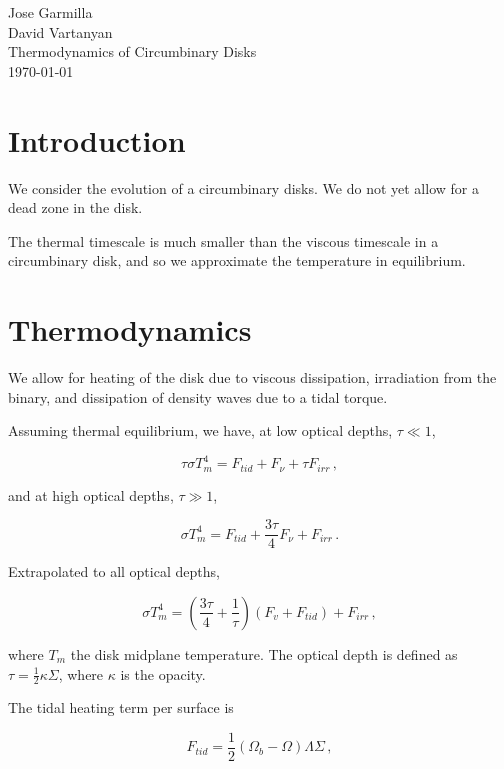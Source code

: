 \documentclass{article}
\begin{document}
\begin{flushleft}
Jose Garmilla \\
David Vartanyan\\
Thermodynamics of Circumbinary Disks\\
\today\\
\end{flushleft}

\section{Introduction}
We consider the evolution of a circumbinary disks. We do not yet allow for a dead zone in the disk.

The thermal timescale is much smaller than the viscous timescale in a circumbinary disk, and so we approximate the temperature in equilibrium.

\section{Thermodynamics}
We allow for heating of the disk due to viscous dissipation, irradiation from the binary, and dissipation of density waves due to a tidal torque.

Assuming thermal equilibrium, we have, at low optical depths, $\tau \ll 1$,

\begin{equation}
\tau \sigma T_m^4 = F_{tid} + F_{\nu} + \tau F_{irr}\,,
\end{equation}

and at high optical depths, $\tau \gg 1$,

\begin{equation}
\sigma T_m^4 = F_{tid} + \frac{3\tau}{4}  F_\nu + F_{irr}\,.
\end{equation}

Extrapolated to all optical depths,

\begin{equation} \label{eq:encon}
\sigma T_m^4= \left(\frac{3\tau}{4} + \frac{1}{\tau}\right) \left(F_{v} + F_{tid}\right) + F_{irr}\,,
\end{equation}

where $T_m$ the disk midplane temperature. The optical depth is defined as $\tau =\frac{1}{2} \kappa \Sigma$, where $\kappa$ is the opacity.

The tidal heating term per surface is

\begin{equation}
F_{tid} = \frac{1}{2}\left(\Omega_b - \Omega\right) \Lambda \Sigma\,,
\end{equation}
\end{document}
